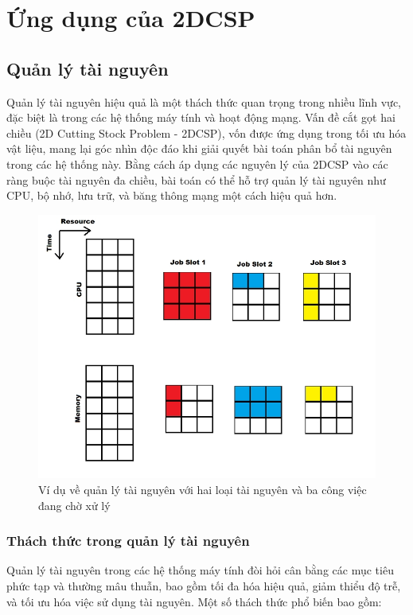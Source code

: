 \section{Ứng dụng của 2DCSP}
\subsection{Quản lý tài nguyên}

\hspace{0.5cm}Quản lý tài nguyên hiệu quả là một thách thức quan trọng trong nhiều lĩnh vực, đặc biệt là trong các hệ thống máy tính và hoạt động mạng. Vấn đề cắt gọt hai chiều (2D Cutting Stock Problem - 2DCSP), vốn được ứng dụng trong tối ưu hóa vật liệu, mang lại góc nhìn độc đáo khi giải quyết bài toán phân bổ tài nguyên trong các hệ thống này. Bằng cách áp dụng các nguyên lý của 2DCSP vào các ràng buộc tài nguyên đa chiều, bài toán có thể hỗ trợ quản lý tài nguyên như CPU, bộ nhớ, lưu trữ, và băng thông mạng một cách hiệu quả hơn.

\begin{figure}[!htp]
    \centering
    \includegraphics[width=0.5\linewidth]{rm.png}
    \caption{Ví dụ về quản lý tài nguyên với hai loại tài nguyên và ba công việc đang chờ xử lý}
    \label{fig:enter-label}
\end{figure}  

\subsubsection{Thách thức trong quản lý tài nguyên}
\hspace{0.5cm}Quản lý tài nguyên trong các hệ thống máy tính đòi hỏi cân bằng các mục tiêu phức tạp và thường mâu thuẫn, bao gồm tối đa hóa hiệu quả, giảm thiểu độ trễ, và tối ưu hóa việc sử dụng tài nguyên\cite{mao2017resource}. Một số thách thức phổ biến bao gồm:  

